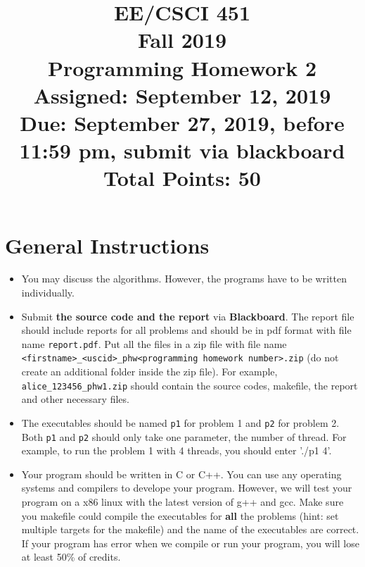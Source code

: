 \documentclass[times, 12pt]{article}
\begin{document}


\title{\bf \large EE/CSCI 451\\ \bf Fall 2019\\ \bf Programming Homework 2 \\ \footnotesize Assigned: September 12, 2019 \\ Due: September 27, 2019, before 11:59 pm, submit via blackboard\\ Total Points: 50}

\date{}

\maketitle

\small

\section*{General Instructions}

\begin{itemize}
	\item You may discuss the algorithms. However, the programs have to be written individually.
	\item Submit \textbf{the source code and the report} via \textbf{Blackboard}. The report file should include reports for all problems and should be in pdf format with file name \texttt{report.pdf}. Put all the files in a zip file  with file name \texttt{<firstname>\_<uscid>\_phw<programming homework number>.zip} (do not create an additional folder inside the zip file). For example, \texttt{alice\_123456\_phw1.zip} should contain the source codes, makefile\cite{makefile}, the report and other necessary files.
	\item The executables should be named \texttt{p1} for problem 1 and \texttt{p2} for problem 2. Both \texttt{p1} and \texttt{p2} should only take one parameter, the number of thread. For example, to run the problem 1 with 4 threads, you should enter './p1 4'.
	\item Your program should be written in C or C++. You can use any operating systems and compilers to develope your program. However, we will test your program on a x86 linux with the latest version of g++ and gcc. Make sure you makefile could compile the executables for \textbf{all} the problems (hint: set multiple targets for the makefile) and the name of the executables are correct. If your program has error when we compile or run your program, you will lose at least 50\% of credits. 
\end{itemize}
\end{document}

